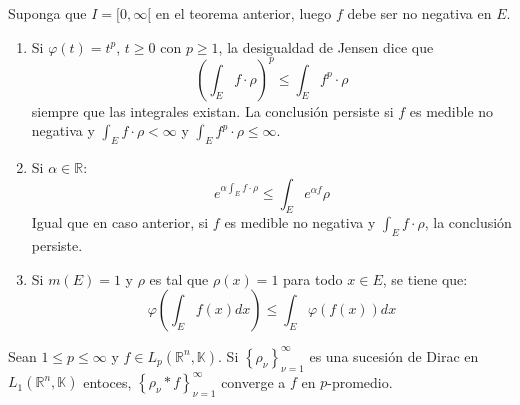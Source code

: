 \documentclass[12pt]{report}
\theoremstyle{largebreak}
\begin{document}
    \begin{exa}
        Suponga que $I=[0,\infty[$ en el teorema anterior, luego $f$ debe ser no negativa en $E$.
        \begin{enumerate}
            \item Si $\varphi(t)=t^p$, $t\geq0$ con $p\geq 1$, la desigualdad de Jensen dice que
            \begin{equation*}
                \left(\int_{E}f\cdot\rho \right)^p\leq\int_Ef^p\cdot\rho
            \end{equation*}
            siempre que las integrales existan. La conclusión persiste si $f$ es medible no negativa y $\int_Ef\cdot\rho<\infty$ y $\int_Ef^p\cdot\rho\leq\infty$.

            \item Si $\alpha\in\mathbb{R}$:
            \begin{equation*}
                e^{\alpha\int_E f\cdot\rho}\leq\int_E e^{\alpha f}\rho
            \end{equation*}
            Igual que en caso anterior, si $f$ es medible no negativa y $\int_E f\cdot\rho$, la conclusión persiste.

            \item Si $m(E)=1$ y $\rho$ es tal que $\rho(x)=1$ para todo $x\in E$, se tiene que:
            \begin{equation*}
                \varphi\left(\int_E f(x)dx \right)\leq\int_E\varphi(f(x))dx
            \end{equation*}
        \end{enumerate}
    \end{exa}

    \begin{theor}
        Sean $1\leq p\leq\infty$ y $f\in L_p(\mathbb{R}^n,\mathbb{K})$. Si $\left\{\rho_\nu \right\}_{\nu=1}^\infty$ es una sucesión de Dirac en $L_1(\mathbb{R}^n,\mathbb{K})$ entoces, $\left\{\rho_\nu*f \right\}_{\nu=1}^\infty$ converge a $f$ en $p$-promedio.
    \end{theor}
\end{document}
